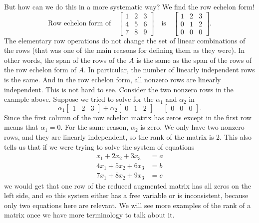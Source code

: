 But how can we do this in a more systematic way?  We find the row echelon
form!
\begin{equation*}
\text{Row echelon form of}
\quad
\begin{bmatrix}
1 & 2 & 3 \\
4 & 5 & 6  \\
7 & 8 & 9
\end{bmatrix}
\quad
\text{is}
\quad
\begin{bmatrix}
1 & 2 & 3 \\
0 & 1 & 2  \\
0 & 0 & 0
\end{bmatrix} .
\end{equation*}
The elementary row operations do not change the set of linear combinations of
the rows (that was one of the main reasons for defining them as they were).
In other words, the span of the rows of the $A$ is the same
as the span of the rows of the row echelon form of $A$.
In particular, the number of linearly independent rows is the same.
And in the row echelon form, all nonzero rows are linearly independent.
This is not hard to see.
Consider the two nonzero rows in the example above.
Suppose we 
tried to solve for the $\alpha_1$ and $\alpha_2$
in
\begin{equation*}
\alpha_1
\begin{bmatrix}
1 & 2 & 3
\end{bmatrix} 
+
\alpha_2
\begin{bmatrix}
0 & 1 & 2 
\end{bmatrix} =
\begin{bmatrix}
0 & 0 & 0
\end{bmatrix} .
\end{equation*}
Since the first column
of the row echelon matrix has zeros except in the first row means that
$\alpha_1 = 0$.  For the same reason, $\alpha_2$ is zero.
We only have two nonzero rows,
and they are linearly independent, so the rank of the matrix is 2. This also tells us that if we were trying to solve the system of equations
\begin{equation*}
\begin{split}
x_1 + 2x_2 + 3x_3 &= a \\
4x_1 + 5x_2 + 6x_3 &= b \\
7x_1 + 8x_2 + 9x_3 &= c
\end{split}
\end{equation*}
we would get that one row of the reduced augmented matrix has all zeros on the left side, and so this system either has a free variable or is inconsistent, because only two equations here are relevant. We will see more examples of the rank of a matrix once we have more terminology to talk about it.

